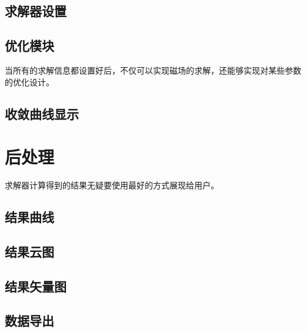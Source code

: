 \subsection{求解器设置}

\subsection{优化模块}
当所有的求解信息都设置好后，不仅可以实现磁场的求解，还能够实现对某些参数的优化设计。

\subsection{收敛曲线显示}

\section{后处理}
求解器计算得到的结果无疑要使用最好的方式展现给用户。
\subsection{结果曲线}

\subsection{结果云图}

\subsection{结果矢量图}

\subsection{数据导出}
